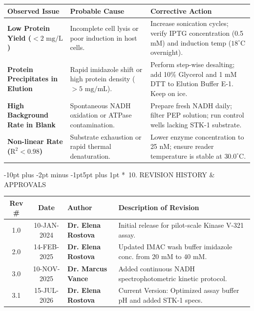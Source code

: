 \documentclass[10pt,a4paper]{article}
\makeatletter
\renewcommand\section{\@startsection{section}{1}{\z@}%
  {-10pt plus -2pt minus -1pt}{5pt plus 1pt}%
  {\normalfont\large\bfseries\color{SopNavy}}}
\makeatother
\begin{document}
\begin{table}[h!]
  \centering
  \scriptsize
  \renewcommand{\arraystretch}{1.2}
  \begin{tabularx}{\textwidth}{|>{\bfseries\color{SopDanger}}p{3.2cm}|Y|Y|}
    \hline
    \color{white}\textbf{Observed Issue} & \color{white}\textbf{Probable Cause} & \color{white}\textbf{Corrective Action} \\ \hline
    Low Protein Yield ($< 2\text{ mg/L}$) & Incomplete cell lysis or poor induction in host cells. & Increase sonication cycles; verify IPTG concentration (0.5 mM) and induction temp ($18^\circ\text{C}$ overnight). \\ \hline
    Protein Precipitates in Elution & Rapid imidazole shift or high protein density ($>5\text{ mg/mL}$). & Perform step-wise desalting; add 10\% Glycerol and 1 mM DTT to Elution Buffer E-1. Keep on ice. \\ \hline
    High Background Rate in Blank & Spontaneous NADH oxidation or ATPase contamination. & Prepare fresh NADH daily; filter PEP solution; run control wells lacking STK-1 substrate. \\ \hline
    Non-linear Rate ($\text{R}^2 < 0.98$) & Substrate exhaustion or rapid thermal denaturation. & Lower enzyme concentration to 25 nM; ensure reader temperature is stable at $30.0^\circ\text{C}$. \\ \hline
  \end{tabularx}
\end{table}

\section*{\faHistory\ 10. REVISION HISTORY \& APPROVALS}

\begin{table}[h!]
  \centering
  \scriptsize
  \renewcommand{\arraystretch}{1.15}
  \begin{tabularx}{\textwidth}{|c|c|>{\bfseries}p{2.8cm}|Y|}
    \hline
    \color{white}\textbf{Rev \#} & \color{white}\textbf{Date} & \color{white}\textbf{Author} & \color{white}\textbf{Description of Revision} \\  & 10-JAN-2024 & Dr. Elena Rostova & Initial release for pilot-scale Kinase V-321 assay. \\ \hline
    2.0 & 14-FEB-2025 & Dr. Elena Rostova & Updated IMAC wash buffer imidazole conc. from 20 mM to 40 mM. \\  & 10-NOV-2025 & Dr. Marcus Vance & Added continuous NADH spectrophotometric kinetic protocol. \\ \hline
    3.1 & 15-JUL-2026 & Dr. Elena Rostova & Current Version: Optimized assay buffer pH and added STK-1 specs. \\ \hline
  \end{tabularx}
\end{table}
\end{document}
